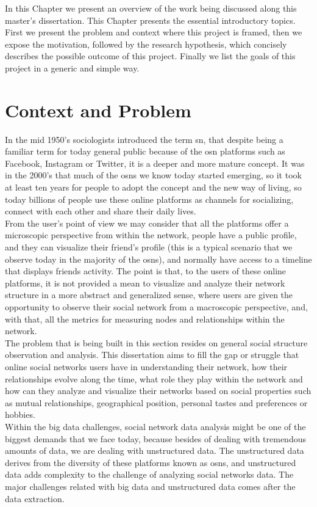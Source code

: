 In this Chapter we present an overview of the work being discussed along this master's dissertation. This Chapter presents the essential introductory topics. First we present the problem and context where this project is framed, then we expose the motivation, followed by the research hypothesis, which concisely describes the possible outcome of this project. Finally we list the goals of this project in a generic and simple way.

\section{Context and Problem}

In the mid 1950's sociologists introduced the term \acrfull{sn}, that despite being a familiar term for today general public because of the \acrfull{osn} platforms such as Facebook, Instagram or Twitter, it is a deeper and more mature concept. It was in the 2000's that much of the \glspl{osn} we know today started emerging, so it took at least ten years for people to adopt the concept and the new way of living, so today billions of people use these online platforms as channels for socializing, connect with each other and share their daily lives.\\
\indent From the user's point of view we may consider that all the platforms offer a microscopic perspective from within the network, people have a public profile, and they can visualize their friend's profile (this is a typical scenario that we observe today in the majority of the \glspl{osn}), and normally have access to a timeline that displays friends activity. The point is that, to the users of these online platforms, it is not provided a mean to visualize and analyze their network structure in a more abstract and generalized sense, where users are given the opportunity to observe their social network from a macroscopic perspective, and, with that, all the metrics for measuring nodes and relationships within the network.\\
\indent The problem that is being built in this section resides on general social structure observation and analysis. This dissertation aims to fill the gap or struggle that online social networks users have in understanding their network, how their relationships evolve along the time, what role they play within the network and how can they analyze and visualize their networks based on social properties such as mutual relationships, geographical position, personal tastes and preferences or hobbies.\\
\indent Within the big data challenges, social network data analysis might be one of the biggest demands that we face today, because besides of dealing with tremendous amounts of data, we are dealing with unstructured data. The unstructured data derives from the diversity of these platforms known as \glspl{osn}, and unstructured data adds complexity to the challenge of analyzing social networks data. The major challenges related with big data and unstructured data comes after the data extraction.

